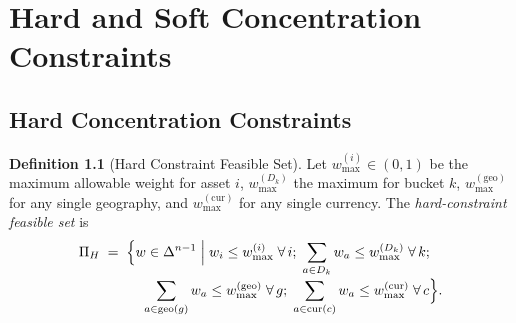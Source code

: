 \documentclass[12pt,openany]{book}
\newcommand{\bfw}{\mathbf{w}}
\newcommand{\calD}{\mathcal{D}}
\numberwithin{equation}{chapter}
\theoremstyle{plain}
\theoremstyle{definition}
\newtheorem{definition}[theorem]{Definition}
\theoremstyle{remark}
\def\calD{D}%
\def\mathcal#1{#1}%
\def\bfw{w}%
\begin{document}
\chapter{Hard and Soft Concentration Constraints}
\label{ch:constraints}

\section{Hard Concentration Constraints}

\begin{definition}[Hard Constraint Feasible Set]
\label{def:hard-feasible}
Let $w_{\max}^{(i)} \in (0, 1)$ be the maximum allowable weight for
asset $i$, $w_{\max}^{(\calD_k)}$ the maximum for bucket $k$,
$w_{\max}^{(\mathrm{geo})}$ for any single geography, and
$w_{\max}^{(\mathrm{cur})}$ for any single currency.
The \emph{hard-constraint feasible set} is
\begin{align}
  \Pi_H
  &\;=\;
  \Bigl\{
    \bfw \in \Delta^{n-1}
    \;\Big|\;
    w_i \leq w_{\max}^{(i)} \;\forall\, i;\;
    \sum_{a \in \calD_k} w_a \leq w_{\max}^{(\calD_k)} \;\forall\, k;\;
    \notag\\[-2pt]
  &\qquad\quad
    \sum_{a \in \mathrm{geo}(g)} w_a \leq w_{\max}^{(\mathrm{geo})}
    \;\forall\, g;\;
    \sum_{a \in \mathrm{cur}(c)} w_a \leq w_{\max}^{(\mathrm{cur})}
    \;\forall\, c
  \Bigr\}.
  \label{eq:hard-feasible}
\end{align}
\end{definition}
\end{document}
